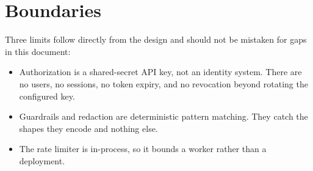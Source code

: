 \section{Boundaries}

Three limits follow directly from the design and should not be mistaken for
gaps in this document:

\begin{itemize}[nosep]
  \item Authorization is a shared-secret API key, not an identity system. There
    are no users, no sessions, no token expiry, and no revocation beyond
    rotating the configured key.
  \item Guardrails and redaction are deterministic pattern matching. They catch
    the shapes they encode and nothing else.
  \item The rate limiter is in-process, so it bounds a worker rather than a
    deployment.
\end{itemize}
